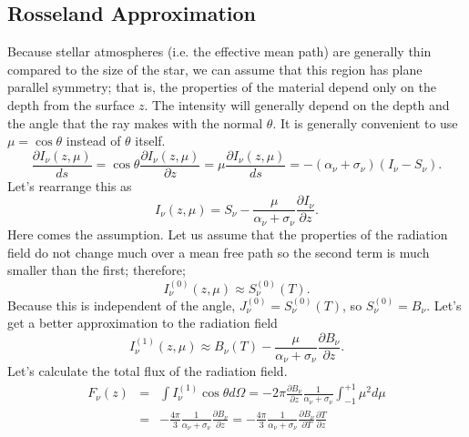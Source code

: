\subsection{Rosseland Approximation}
\label{sec:ross-appr}
Because stellar atmospheres (i.e. the effective mean path) are
generally thin compared to the size of the star, we can assume that
this region has plane parallel symmetry; that is, the properties
of the material depend only on the depth from the surface $z$.   The
intensity will generally depend on the depth and the angle that the
ray makes with the normal $\theta$.   It is generally convenient to
use $\mu=\cos \theta$ instead of $\theta$ itself.
\begin{equation}
\frac{\partial I_\nu(z,\mu)}{ds} = \cos \theta \frac{\partial
  I_\nu(z,\mu)}{\partial z} = \mu \frac{\partial I_\nu(z,\mu)}{ds} 
= - \left ( \alpha_\nu + \sigma_\nu \right ) \left (I_\nu - S_\nu
\right ).
\label{eq:102}
\end{equation}
Let's rearrange this as
\begin{equation}
I_\nu (z,\mu ) = S_\nu - \frac{\mu}{\alpha_\nu +\sigma_\nu}
\frac{\partial I_\nu}{\partial z}.
\label{eq:103}
\end{equation}
Here comes the assumption.  Let us assume that the properties of the
radiation field do not change much over a mean free path so the second
term is much smaller than the first; therefore;
\begin{equation}
I_\nu^{(0)} (z,\mu) \approx S_\nu^{(0)}(T).
\label{eq:104}
\end{equation}
Because this is independent of the angle,
$J_\nu^{(0)}=S_\nu^{(0)}(T)$, so $S_\nu^{(0)}=B_\nu$.  Let's get a
better approximation to the radiation field
\begin{equation}
I_\nu^{(1)} (z,\mu) \approx B_\nu(T) - \frac{\mu}{\alpha_\nu +\sigma_\nu}
\frac{\partial B_\nu}{\partial z}.
\label{eq:105}
\end{equation}
Let's calculate the total flux of the radiation field. 
\begin{eqnarray}
\label{eq:106}
F_\nu(z) &=& \int I_\nu^{(1)} \cos\theta d \Omega = 
-2\pi \frac{\partial B_\nu}{\partial z} \frac{1}{\alpha_\nu
  +\sigma_\nu} \int_{-1}^{+1} \mu^2 d \mu \\
 &=& -\frac{4\pi}{3}  \frac{1}{\alpha_\nu
  +\sigma_\nu} \frac{\partial B_\nu}{\partial z} = 
-\frac{4\pi}{3}  \frac{1}{\alpha_\nu
  +\sigma_\nu} \frac{\partial B_\nu}{\partial T} \frac{\partial
  T}{\partial z}
\label{eq:107}
\end{eqnarray}
